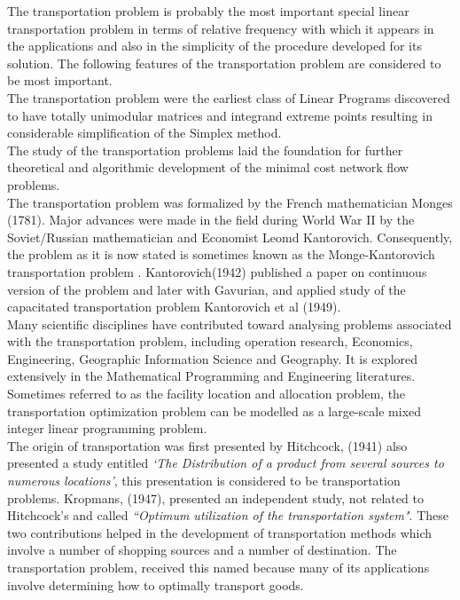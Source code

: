 \documentclass[12pt]{report}
\newcommand{\NI}{\noindent}
\newcommand{\stp}{transportation problem }
\newcommand{\stps}{transportation problems }
\begin{document}
	\NI The \stp is probably the most important special linear \stp in terms of relative frequency with which it appears in the applications and also in the simplicity of the procedure developed for its solution. The following features of the transportation problem are considered to be most important.\\
	
	\NI The \stp were the earliest class of Linear Programs discovered to have totally unimodular matrices and integrand extreme points resulting in considerable simplification of the Simplex method.\\
	
	\NI The study of the \stps laid the foundation for further theoretical and algorithmic development of the minimal cost network flow problems.\\
	
	\NI The \stp was formalized by the French mathematician Monges (1781). Major advances were made in the field during World War II by the Soviet/Russian mathematician and Economist Leomd Kantorovich. Consequently, the problem as it is now stated is sometimes known as the Monge-Kantorovich \stp. Kantorovich(1942) published a paper on continuous version of the problem and later with Gavurian, and applied study of the capacitated transportation problem Kantorovich et al (1949).\\
	
	\NI Many scientific disciplines have contributed toward analysing problems associated with the transportation problem, including operation research, Economics, Engineering, Geographic Information Science and Geography. It is explored extensively in the Mathematical Programming and Engineering literatures. Sometimes referred to as the facility location and allocation problem, the transportation optimization problem can be modelled as a large-scale mixed integer linear programming problem.\\
	
	\NI The origin of transportation was first presented by Hitchcock, (1941) also presented a study entitled \textit{`The Distribution of a product from several sources to numerous locations'}, this presentation is considered to be transportation problems. Kropmans, (1947), presented an independent study, not related to Hitchcock's and called \textit{``Optimum utilization of the transportation system"}. These two contributions helped in the development of transportation methods which involve a number of shopping sources and a number of destination. The transportation problem, received this named because many of its applications involve determining how to optimally transport goods.
	
\end{document}
